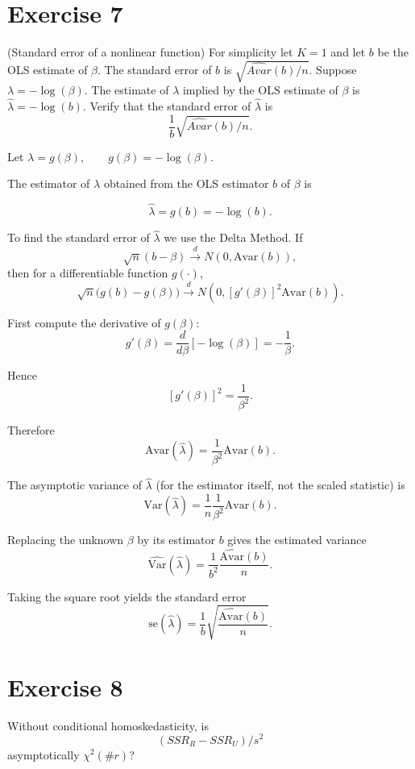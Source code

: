 \documentclass[12pt, letterpaper, onecolumn]{exam}
\begin{document}
\section*{Exercise 7}
 (Standard error of a nonlinear function) For simplicity let $K=1$ and let $b$
be the OLS estimate of $\beta$. The standard error of $b$ is
$\sqrt{\widehat{Avar}(b)/n}$. Suppose $\lambda=-\log(\beta)$. The estimate
of $\lambda$ implied by the OLS estimate of $\beta$ is
$\hat{\lambda}=-\log(b)$. Verify that the standard error of $\hat{\lambda}$ is
\[
    \frac{1}{b}\sqrt{\widehat{Avar}(b)/n}.
\]

\begin{solution}
    Let $\lambda = g(\beta), \qquad g(\beta) = -\log(\beta).$

    The estimator of $\lambda$ obtained from the OLS estimator $b$ of
    $\beta$ is

    \[
        \hat{\lambda}= g(b) = -\log(b).
    \]

    To find the standard error of $\hat{\lambda}$ we use the Delta Method. If
    \[
        \sqrt{n}(b-\beta) \xrightarrow{d}N(0,\mathrm{Avar}(b)),
    \]
    then for a differentiable function $g(\cdot)$,
    \[
        \sqrt{n}\big(g(b)-g(\beta)\big) \xrightarrow{d}N\!\left(0,\left[g'(\beta
                )\right]^{2}\mathrm{Avar}(b)\right).
    \]

    First compute the derivative of $g(\beta)$:
    \[
        g'(\beta)=\frac{d}{d\beta}[-\log(\beta)]=-\frac{1}{\beta}.
    \]

    Hence
    \[
        [g'(\beta)]^{2}=\frac{1}{\beta^{2}}.
    \]

    Therefore
    \[
        \mathrm{Avar}(\hat{\lambda}) = \frac{1}{\beta^{2}}\mathrm{Avar}(b).
    \]

    The asymptotic variance of $\hat{\lambda}$ (for the estimator itself, not
    the scaled statistic) is
    \[
        \mathrm{Var}(\hat{\lambda}) = \frac{1}{n}\frac{1}{\beta^{2}}\mathrm{Avar}
        (b).
    \]

    Replacing the unknown $\beta$ by its estimator $b$ gives the estimated variance
    \[
        \widehat{\mathrm{Var}}(\hat{\lambda}) = \frac{1}{b^{2}}\frac{\widehat{\mathrm{Avar}}(b)}{n}
        .
    \]

    Taking the square root yields the standard error
    \[
        \mathrm{se}(\hat{\lambda}) = \frac{1}{b}\sqrt{\frac{\widehat{\mathrm{Avar}}(b)}{n}}
        .
    \]
\end{solution}

\section*{Exercise 8}
Without conditional homoskedasticity, is
\[
    (SSR_{R}-SSR_{U})/s^{2}
\]
asymptotically $\chi^{2}(\#r)$?
\end{document}
